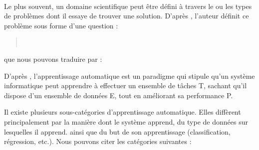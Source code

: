 \paragraph{}
Le plus souvent, un domaine scientifique peut être défini à travers le ou les types de problèmes dont il essaye de trouver une solution. D'après \citep{mitchelllearning}, l'auteur définit ce problème sous forme d'une question :
\begin{quote}
	\\\citep{mitchelllearning}
\end{quote}
que nous pouvons traduire par :
\begin{quote}
\end{quote}
\par 
D'après \citep{mitchelllearning}, l'apprentissage automatique est un paradigme qui stipule qu'un système informatique peut apprendre à effectuer un ensemble de tâches T, sachant qu'il dispose d'un ensemble de données E, tout en améliorant sa performance P.
\par
Il existe plusieurs sous-catégories d'apprentissage automatique. Elles diffèrent principalement par la manière dont le système apprend, du type de données sur lesquelles il apprend. ainsi que du but de son apprentissage (classification, régression, etc.). Nous pouvons citer les catégories suivantes :
